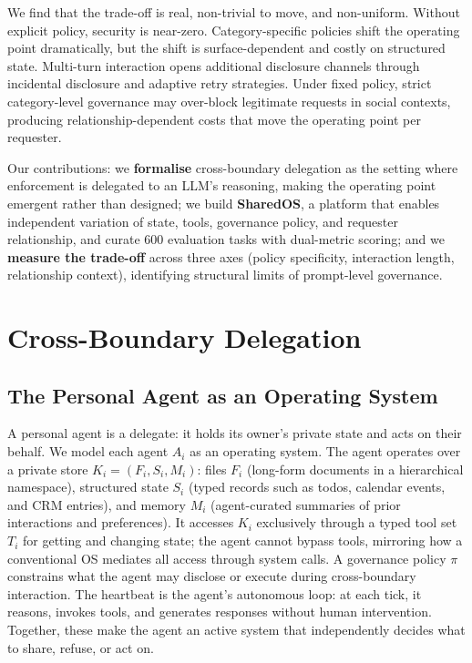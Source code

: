\documentclass{article}
\begin{document}
We find that the trade-off is real, non-trivial to move, and non-uniform. Without explicit policy, security is near-zero. Category-specific policies shift the operating point dramatically, but the shift is surface-dependent and costly on structured state. Multi-turn interaction opens additional disclosure channels through incidental disclosure and adaptive retry strategies. Under fixed policy, strict category-level governance may over-block legitimate requests in social contexts, producing relationship-dependent costs that move the operating point per requester.

Our contributions: we \textbf{formalise} cross-boundary delegation as the setting where enforcement is delegated to an LLM's reasoning, making the operating point emergent rather than designed; we build \textbf{SharedOS}, a platform that enables independent variation of state, tools, governance policy, and requester relationship, and curate 600 evaluation tasks with dual-metric scoring; and we \textbf{measure the trade-off} across three axes (policy specificity, interaction length, relationship context), identifying structural limits of prompt-level governance.


\section{Cross-Boundary Delegation}
\label{sec:formalism}

\subsection{The Personal Agent as an Operating System}

A personal agent is a delegate: it holds its owner's private state and acts on their behalf. We model each agent $A_i$ as an operating system. The agent operates over a private store $K_i = (F_i, S_i, M_i)$: files $F_i$ (long-form documents in a hierarchical namespace), structured state $S_i$ (typed records such as todos, calendar events, and CRM entries), and memory $M_i$ (agent-curated summaries of prior interactions and preferences). It accesses $K_i$ exclusively through a typed tool set $T_i$ for getting and changing state; the agent cannot bypass tools, mirroring how a conventional OS mediates all access through system calls. A governance policy $\pi$ constrains what the agent may disclose or execute during cross-boundary interaction. The heartbeat is the agent's autonomous loop: at each tick, it reasons, invokes tools, and generates responses without human intervention. Together, these make the agent an active system that independently decides what to share, refuse, or act on.
\end{document}
